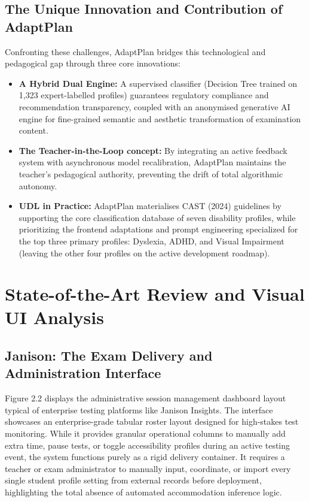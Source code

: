 \documentclass[12pt,a4paper]{report}
\begin{document}
\subsection{The Unique Innovation and Contribution of AdaptPlan}

Confronting these challenges, AdaptPlan bridges this technological and pedagogical gap through three core innovations:

\begin{itemize}[leftmargin=*]
  \item \textbf{A Hybrid Dual Engine:} A supervised classifier (Decision Tree trained on 1,323 expert-labelled profiles) guarantees regulatory compliance and recommendation transparency, coupled with an anonymised generative AI engine for fine-grained semantic and aesthetic transformation of examination content.
  \item \textbf{The Teacher-in-the-Loop concept:} By integrating an active feedback system with asynchronous model recalibration, AdaptPlan maintains the teacher's pedagogical authority, preventing the drift of total algorithmic autonomy.
  \item \textbf{UDL in Practice:} AdaptPlan materialises CAST (2024) guidelines by supporting the core classification database of seven disability profiles, while prioritizing the frontend adaptations and prompt engineering specialized for the top three primary profiles: Dyslexia, ADHD, and Visual Impairment (leaving the other four profiles on the active development roadmap).
\end{itemize}

\section{State-of-the-Art Review and Visual UI Analysis}
\setcounter{figure}{1} %

\subsection{Janison: The Exam Delivery and Administration Interface}
Figure 2.2 displays the administrative session management dashboard layout typical of enterprise testing platforms like Janison Insights. The interface showcases an enterprise-grade tabular roster layout designed for high-stakes test monitoring. While it provides granular operational columns to manually add extra time, pause tests, or toggle accessibility profiles during an active testing event, the system functions purely as a rigid delivery container. It requires a teacher or exam administrator to manually input, coordinate, or import every single student profile setting from external records before deployment, highlighting the total absence of automated accommodation inference logic.
\end{document}
